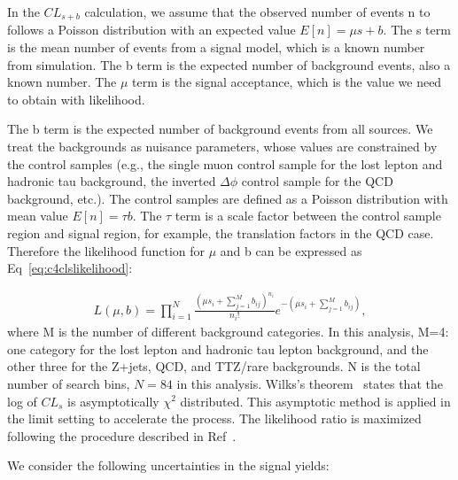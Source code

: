 In the $CL_{s+b}$ calculation, we assume that the observed number of events n to follows a Poisson distribution with an expected value $E[n]=\mu s+b$. The s term is the mean number of events from a signal model, which is a known number from simulation. The b term is the expected number of background events, also a known number. The $\mu$ term is the signal acceptance, which is the value we need to obtain with likelihood. 

The b term is the expected number of background events from all sources. We treat the backgrounds as nuisance parameters, whose values are constrained by the control samples (e.g., the single muon control sample for the lost lepton and hadronic tau background, the inverted $\Delta \phi$ control sample for the QCD background, etc.). The control samples are defined as a Poisson distribution with mean value $E[n]=\tau b$. The $\tau$ term is a scale factor between the control sample region and signal region, for example, the translation factors in the QCD case. Therefore the likelihood function for $\mu$ and b can be expressed as Eq~\ref{eq:c4clslikelihood}:

\begin{equation}
 \begin{aligned}
	 L(\mu,b)= \prod_{i=1}^{N} \frac{(\mu s_{i}+\sum_{j=1}^{M}b_{ij})^{n_{i}}}{n_{i}!}e^{-(\mu s_{i}+\sum_{j=1}^{M}b_{ij})},
 \end{aligned}
 \label{eq:c4clslikelihood}
\end{equation}
where M is the number of different background categories. In this analysis, M=4: one category for the lost lepton and hadronic tau lepton background, and the other three for the Z+jets, QCD, and TTZ/rare backgrounds. N is the total number of search bins, $N=84$ in this analysis. Wilks's theorem~\cite{Wilks:1938dza} states that the log of $CL_{s}$ is asymptotically $\chi^{2}$ distributed. This asymptotic method is applied in the limit setting to accelerate the process. The likelihood ratio is maximized following the procedure described in Ref~\cite{Cowan:2010js}.

We consider the following uncertainties in the signal yields: 

